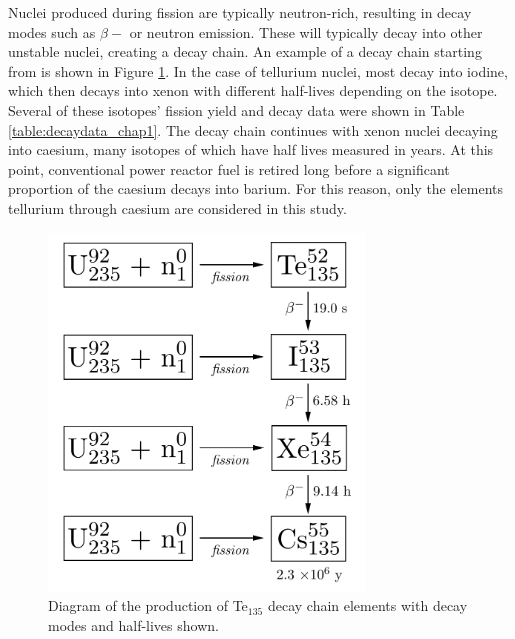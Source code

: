 Nuclei produced during fission are typically neutron-rich, resulting in decay modes such as $\beta-$ or neutron emission. These will typically decay into other unstable nuclei, creating a decay chain. An example of a decay chain starting from  is shown in Figure \ref{fig:decaychain}. In the case of tellurium nuclei, most decay into iodine, which then decays into xenon with different half-lives depending on the isotope. Several of these isotopes' fission yield and decay data were shown in Table \ref{table:decaydata_chap1}. The decay chain continues with xenon nuclei decaying into caesium, many isotopes of which have half lives measured in years. At this point, conventional power reactor fuel is retired long before a significant proportion of the caesium decays into barium. For this reason, only the elements tellurium through caesium are considered in this study. 

\begin{figure}[ht] %
    \centering
    \includegraphics[height=9.5cm]{images/te_decay_chain2.png}
    \caption{Diagram of the production of Te$_{135}$ decay chain elements with decay modes and half-lives shown.}
    \label{fig:decaychain}
\end{figure}

